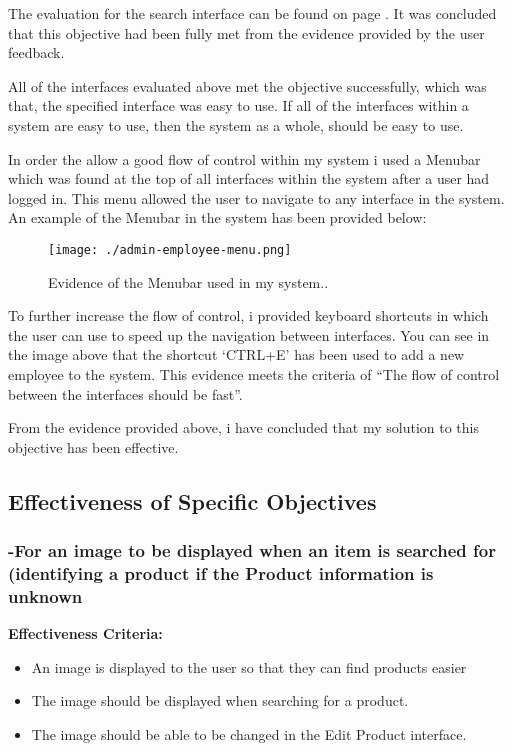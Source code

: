 The evaluation for the search interface can be found on page \pageref{search}. It was concluded that this objective had been fully met from the evidence provided by the user feedback. 

All of the interfaces evaluated above met the objective successfully, which was that, the specified interface was easy to use. If all of the interfaces within a system are easy to use, then the system as a whole, should be easy to use.

In order the allow a good flow of control within my system i used a Menubar which was found at the top of all interfaces within the system after a user had logged in. This menu allowed the user to navigate to any interface in the system. An example of the Menubar in the system has been provided below:

\begin{figure}[H]
\caption{Evidence of the Menubar used in my system..}
\hfill\texttt{[image: ./admin-employee-menu.png]}
\end{figure}

To further increase the flow of control, i provided keyboard shortcuts in which the user can use to speed up the navigation between interfaces. You can see in the image above that the shortcut `CTRL+E' has been used to add a new employee to the system. This evidence meets the criteria of ``The flow of control between the interfaces should be fast''.

From the evidence provided above, i have concluded that my solution to this objective has been effective.





\pagebreak
\subsection{Effectiveness of Specific Objectives}


\subsubsection{-For an image to be displayed when an item is searched for (identifying a product if the Product information is unknown}

\textbf{Effectiveness Criteria:}\newline
\begin{itemize}
	\item{An image is displayed to the user so that they can find products easier}
	\item{The image should be displayed when searching for a product.}
	\item{The image should be able to be changed in the Edit Product interface.}
\end{itemize}

